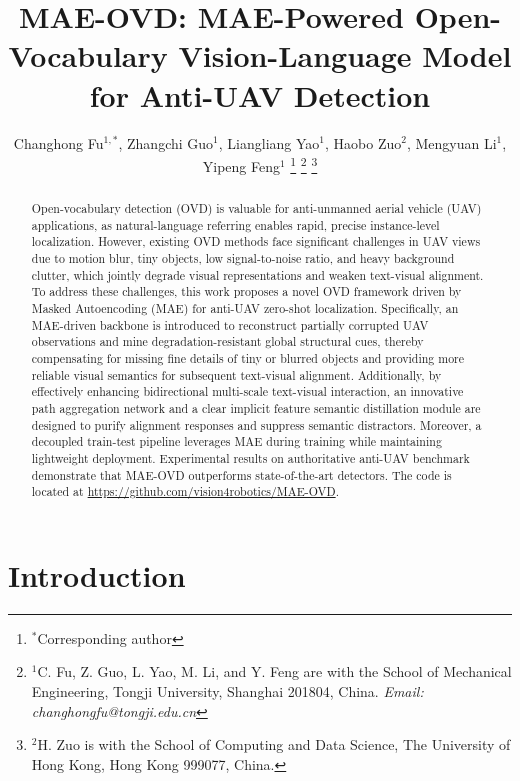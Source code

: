 \documentclass[letterpaper, 10 pt, conference]{ieeeconf}  %
\title{\LARGE \bf
MAE-OVD: MAE-Powered Open-Vocabulary Vision-Language Model for Anti-UAV Detection}
\author{Changhong Fu$^{1,*}$, Zhangchi Guo$^{1}$, Liangliang Yao$^{1}$, Haobo Zuo$^{2}$, Mengyuan Li$^{1}$, Yipeng Feng$^{1}$ %
\thanks{$^{*}$Corresponding author}
\thanks{
$^{1}$C. Fu, Z. Guo, L. Yao, M. Li, and Y. Feng are with the School of Mechanical Engineering, Tongji University, Shanghai 201804, China.
\itshape{Email: changhongfu@tongji.edu.cn}
}
\thanks{
$^{2}$H. Zuo is with the School of Computing and Data Science, The University of Hong Kong, Hong Kong 999077, China.
}
%
}
\begin{document}
\maketitle
\thispagestyle{empty}
\pagestyle{empty}

\noindent
\begin{abstract}

Open-vocabulary detection (OVD) is valuable for anti-unmanned aerial vehicle (UAV) applications, as natural-language referring enables rapid, precise instance-level localization. However, existing OVD methods face significant challenges in UAV views due to motion blur, tiny objects, low signal-to-noise ratio, and heavy background clutter, which jointly degrade visual representations and weaken text-visual alignment. To address these challenges, this work proposes a novel OVD framework driven by Masked Autoencoding (MAE) for anti-UAV zero-shot localization. Specifically, an MAE-driven backbone is introduced to reconstruct partially corrupted UAV observations and mine degradation-resistant global structural cues, thereby compensating for missing fine details of tiny or blurred objects and providing more reliable visual semantics for subsequent text-visual alignment. Additionally, by effectively enhancing bidirectional multi-scale text-visual interaction, an innovative path aggregation network and a clear implicit feature semantic distillation module are designed to purify alignment responses and suppress semantic distractors. Moreover, a decoupled train-test pipeline leverages MAE during training while maintaining lightweight deployment. Experimental results on authoritative anti-UAV benchmark demonstrate that MAE-OVD outperforms state-of-the-art detectors. The code is located at \url{https://github.com/vision4robotics/MAE-OVD}.

\end{abstract}

\section{Introduction}
\label{sec:introduction}
\end{document}
